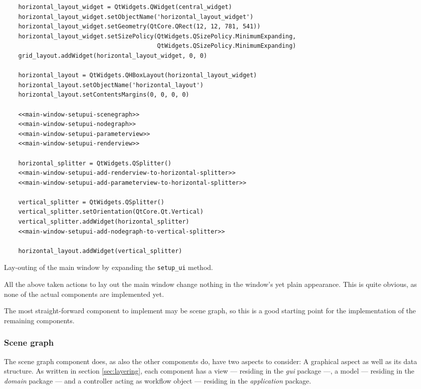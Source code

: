 \documentclass[10pt, openright, notitlepage]{scrreprt}
\begin{document}
\begin{listing}[H]
\begin{verbatim}
    horizontal_layout_widget = QtWidgets.QWidget(central_widget)
    horizontal_layout_widget.setObjectName('horizontal_layout_widget')
    horizontal_layout_widget.setGeometry(QtCore.QRect(12, 12, 781, 541))
    horizontal_layout_widget.setSizePolicy(QtWidgets.QSizePolicy.MinimumExpanding,
                                           QtWidgets.QSizePolicy.MinimumExpanding)
    grid_layout.addWidget(horizontal_layout_widget, 0, 0)

    horizontal_layout = QtWidgets.QHBoxLayout(horizontal_layout_widget)
    horizontal_layout.setObjectName('horizontal_layout')
    horizontal_layout.setContentsMargins(0, 0, 0, 0)

    <<main-window-setupui-scenegraph>>
    <<main-window-setupui-nodegraph>>
    <<main-window-setupui-parameterview>>
    <<main-window-setupui-renderview>>

    horizontal_splitter = QtWidgets.QSplitter()
    <<main-window-setupui-add-renderview-to-horizontal-splitter>>
    <<main-window-setupui-add-parameterview-to-horizontal-splitter>>

    vertical_splitter = QtWidgets.QSplitter()
    vertical_splitter.setOrientation(QtCore.Qt.Vertical)
    vertical_splitter.addWidget(horizontal_splitter)
    <<main-window-setupui-add-nodegraph-to-vertical-splitter>>

    horizontal_layout.addWidget(vertical_splitter)
\end{verbatim}
\caption{\label{main-window-setupui}
Lay-outing of the main window by expanding the \texttt{setup\_ui} method.}
\end{listing}

All the above taken actions to lay out the main window change nothing in the
window's yet plain appearance. This is quite obvious, as none of the actual
components are implemented yet.

The most straight-forward component to implement may be scene graph, so this is
a good starting point for the implementation of the remaining components.

\subsubsection{Scene graph}
\label{sec:org41367fd}

The scene graph component does, as also the other components do, have two
aspects to consider: A graphical aspect as well as its data structure. As
written in section \ref{sec:layering}, each component has a view --- residing in the \emph{gui}
package ---, a model --- residing in the \emph{domain} package --- and a controller
acting as workflow object --- residing in the \emph{application} package.
\end{document}
